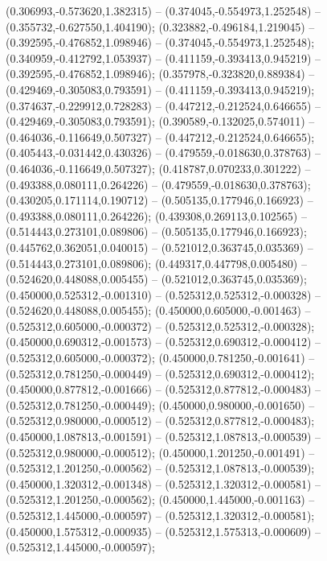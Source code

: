  (0.306993,-0.573620,1.382315) -- (0.374045,-0.554973,1.252548) -- (0.355732,-0.627550,1.404190);
 (0.323882,-0.496184,1.219045) -- (0.392595,-0.476852,1.098946) -- (0.374045,-0.554973,1.252548);
 (0.340959,-0.412792,1.053937) -- (0.411159,-0.393413,0.945219) -- (0.392595,-0.476852,1.098946);
 (0.357978,-0.323820,0.889384) -- (0.429469,-0.305083,0.793591) -- (0.411159,-0.393413,0.945219);
 (0.374637,-0.229912,0.728283) -- (0.447212,-0.212524,0.646655) -- (0.429469,-0.305083,0.793591);
 (0.390589,-0.132025,0.574011) -- (0.464036,-0.116649,0.507327) -- (0.447212,-0.212524,0.646655);
 (0.405443,-0.031442,0.430326) -- (0.479559,-0.018630,0.378763) -- (0.464036,-0.116649,0.507327);
 (0.418787,0.070233,0.301222) -- (0.493388,0.080111,0.264226) -- (0.479559,-0.018630,0.378763);
 (0.430205,0.171114,0.190712) -- (0.505135,0.177946,0.166923) -- (0.493388,0.080111,0.264226);
 (0.439308,0.269113,0.102565) -- (0.514443,0.273101,0.089806) -- (0.505135,0.177946,0.166923);
 (0.445762,0.362051,0.040015) -- (0.521012,0.363745,0.035369) -- (0.514443,0.273101,0.089806);
 (0.449317,0.447798,0.005480) -- (0.524620,0.448088,0.005455) -- (0.521012,0.363745,0.035369);
 (0.450000,0.525312,-0.001310) -- (0.525312,0.525312,-0.000328) -- (0.524620,0.448088,0.005455);
 (0.450000,0.605000,-0.001463) -- (0.525312,0.605000,-0.000372) -- (0.525312,0.525312,-0.000328);
 (0.450000,0.690312,-0.001573) -- (0.525312,0.690312,-0.000412) -- (0.525312,0.605000,-0.000372);
 (0.450000,0.781250,-0.001641) -- (0.525312,0.781250,-0.000449) -- (0.525312,0.690312,-0.000412);
 (0.450000,0.877812,-0.001666) -- (0.525312,0.877812,-0.000483) -- (0.525312,0.781250,-0.000449);
 (0.450000,0.980000,-0.001650) -- (0.525312,0.980000,-0.000512) -- (0.525312,0.877812,-0.000483);
 (0.450000,1.087813,-0.001591) -- (0.525312,1.087813,-0.000539) -- (0.525312,0.980000,-0.000512);
 (0.450000,1.201250,-0.001491) -- (0.525312,1.201250,-0.000562) -- (0.525312,1.087813,-0.000539);
 (0.450000,1.320312,-0.001348) -- (0.525312,1.320312,-0.000581) -- (0.525312,1.201250,-0.000562);
 (0.450000,1.445000,-0.001163) -- (0.525312,1.445000,-0.000597) -- (0.525312,1.320312,-0.000581);
 (0.450000,1.575312,-0.000935) -- (0.525312,1.575313,-0.000609) -- (0.525312,1.445000,-0.000597);
